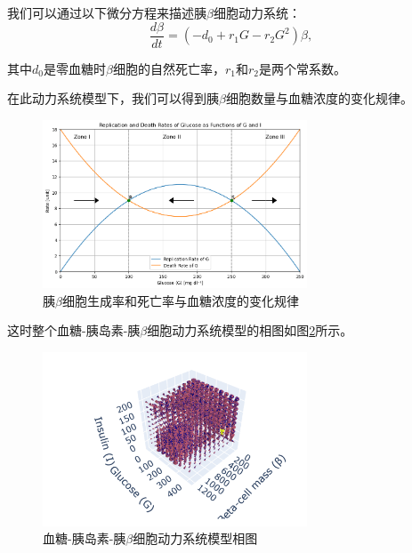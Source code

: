 我们可以通过以下微分方程来描述胰$\beta$细胞动力系统：
\begin{equation}
    \frac{d\beta}{dt} = (-d_0+r_1G-r_2G^2)\beta,
\end{equation}

其中$d_0$是零血糖时$\beta$细胞的自然死亡率，$r_1$和$r_2$是两个常系数\cite{topp2000model}。

在此动力系统模型下，我们可以得到胰$\beta$细胞数量与血糖浓度的变化规律。
\begin{figure}[H]
    \centering
    \includegraphics[width=0.7\textwidth]{Img/betarate.png}
    \caption{胰$\beta$细胞生成率和死亡率与血糖浓度的变化规律}
    \label{fig:beta}
\end{figure}

这时整个血糖-胰岛素-胰$\beta$细胞动力系统模型的相图如图\ref{fig:3dphase}所示。
\begin{figure}[H]
    \centering
    \includegraphics[width=0.7\textwidth]{Img/3dphase.png}
    \caption{血糖-胰岛素-胰$\beta$细胞动力系统模型相图}
    \label{fig:3dphase}
\end{figure}

